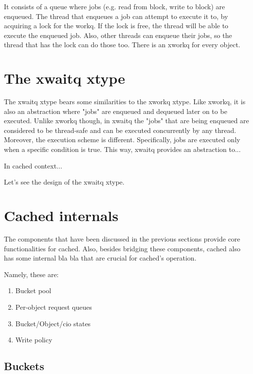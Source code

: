 
It consists of a queue where jobs (e.g.  read from block, write to block) are 
enqueued. The thread that enqueues a job can attempt to execute it to, by 
acquiring a lock for the workq. If the lock is free, the thread will be able to 
execute the enqueued job. Also, other threads can enqueue their jobs, so the 
thread that has the lock can do those too. There is an xworkq for every object.


\section{The xwaitq xtype}

The xwaitq xtype bears some similarities to the xworkq xtype. Like xworkq, it is 
also an abstraction where "jobs" are enqueued and dequeued later on to be 
executed. Unlike xworkq though, in xwaitq the "jobs" that are being enqueued are 
considered to be thread-safe and can be executed concurrently by any thread.  
Moreover, the execution scheme is different. Specifically, jobs are executed 
only when a specific condition is true. This way, xwaitq provides an abstraction 
to...

In cached context...

Let's see the design of the xwaitq xtype. 


\section{Cached internals}

The components that have been discussed in the previous sections provide core 
functionalities for cached. Also, besides bridging these components, cached also 
has some internal bla bla that are crucial for cached's operation.

Namely, these are:

\begin{enumerate}
	\item Bucket pool
	\item Per-object request queues
	\item Bucket/Object/cio states
	\item Write policy
\end{enumerate}

\subsection{Buckets}

